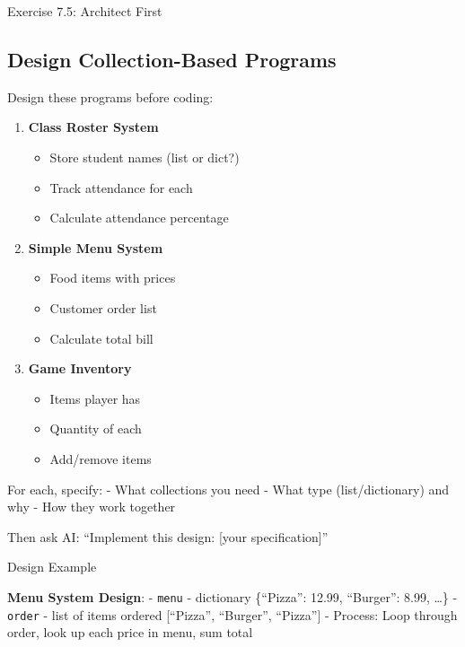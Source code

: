 \documentclass[
  letterpaper,
  DIV=11,
  numbers=noendperiod,
  oneside]{scrreprt}
\providecommand{\tightlist}{%
  \setlength{\itemsep}{0pt}\setlength{\parskip}{0pt}}\usepackage{longtable,booktabs,array}
\begin{document}
Exercise 7.5: Architect First

\subsection{Design Collection-Based
Programs}\label{design-collection-based-programs}

Design these programs before coding:

\begin{enumerate}
\def\labelenumi{\arabic{enumi}.}
\tightlist
\item
  \textbf{Class Roster System}

  \begin{itemize}
  \tightlist
  \item
    Store student names (list or dict?)
  \item
    Track attendance for each
  \item
    Calculate attendance percentage
  \end{itemize}
\item
  \textbf{Simple Menu System}

  \begin{itemize}
  \tightlist
  \item
    Food items with prices
  \item
    Customer order list
  \item
    Calculate total bill
  \end{itemize}
\item
  \textbf{Game Inventory}

  \begin{itemize}
  \tightlist
  \item
    Items player has
  \item
    Quantity of each
  \item
    Add/remove items
  \end{itemize}
\end{enumerate}

For each, specify: - What collections you need - What type
(list/dictionary) and why - How they work together

Then ask AI: ``Implement this design: {[}your specification{]}''

Design Example

\textbf{Menu System Design}: - \texttt{menu} - dictionary \{``Pizza'':
12.99, ``Burger'': 8.99, \ldots\} - \texttt{order} - list of items
ordered {[}``Pizza'', ``Burger'', ``Pizza''{]} - Process: Loop through
order, look up each price in menu, sum total
\end{document}
